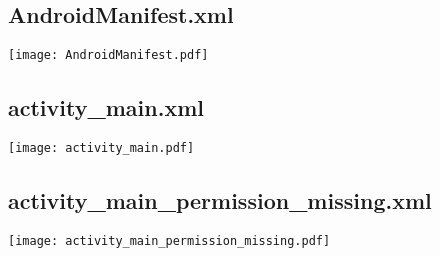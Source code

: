 \documentclass[11pt]{article}
\begin{document}
\subsection{AndroidManifest.xml}
\texttt{[image: AndroidManifest.pdf]}
\subsection{activity\_main.xml}
\texttt{[image: activity\_main.pdf]}

\subsection{activity\_main\_permission\_missing.xml}
\texttt{[image: activity\_main\_permission\_missing.pdf]}
\end{document}
